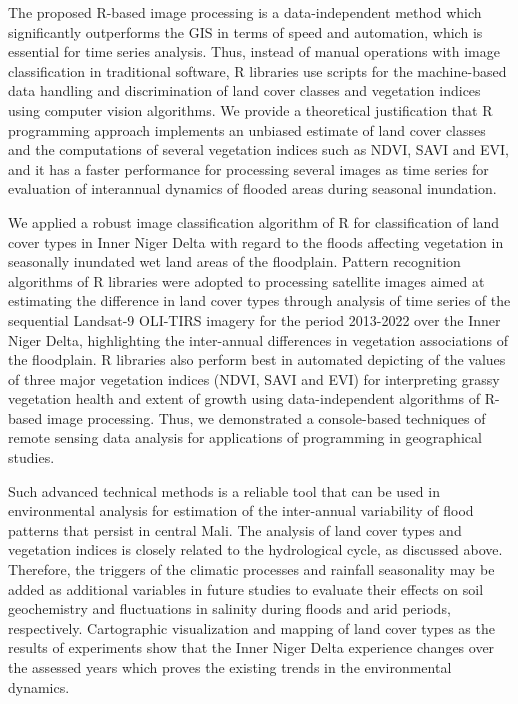 \documentclass[12pt,a4paper,oneside]{article}
\def \newpar{\vspace{6pt}}
\begin{document}
\newpar The proposed R-based image processing is a data-independent method which significantly outperforms the GIS in terms of speed and automation, which is essential for time series analysis. Thus, instead of manual operations with image classification in traditional software, R libraries use scripts for the machine-based data handling and discrimination of land cover classes and vegetation indices using computer vision algorithms. We provide a theoretical justification that R programming approach implements an unbiased estimate of land cover classes and the computations of several vegetation indices such as NDVI, SAVI and EVI, and it has a faster performance for processing several images as time series for evaluation of interannual dynamics of flooded areas during seasonal inundation. 

\newpar We applied a robust image classification algorithm of R for classification of land cover types in Inner Niger Delta with regard to the floods affecting vegetation in seasonally inundated wet land areas of the floodplain. Pattern recognition algorithms of R libraries were adopted to processing satellite images aimed at estimating the difference in land cover types through analysis of time series of the sequential Landsat-9 OLI-TIRS imagery for the period 2013-2022 over the Inner Niger Delta, highlighting the inter-annual differences in vegetation associations of the floodplain. R libraries also perform best in automated depicting of the values of three major vegetation indices (NDVI, SAVI and EVI) for interpreting grassy vegetation health and extent of growth using data-independent algorithms of R-based image processing. Thus, we demonstrated a console-based techniques of remote sensing data analysis for applications of programming in geographical studies. 

\newpar Such advanced technical methods is a reliable tool that can be used in environmental analysis for estimation of the inter-annual variability of flood patterns that persist in central Mali. The analysis of land cover types and vegetation indices is closely related to the hydrological cycle, as discussed above. Therefore, the triggers of the climatic processes and rainfall seasonality may be added as additional variables in future studies to evaluate their effects on soil geochemistry and fluctuations in salinity during floods and arid periods, respectively. Cartographic visualization and mapping of land cover types as the results of experiments show that the Inner Niger Delta experience changes over the assessed years which proves the existing trends in the environmental dynamics.  
\end{document}
